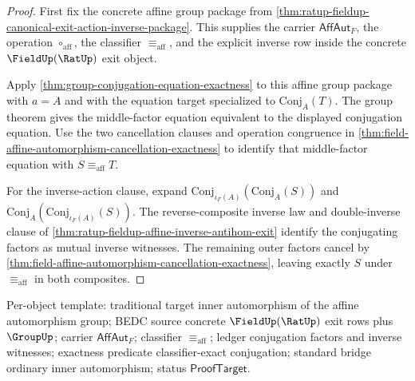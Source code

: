 \begin{proof}
First fix the concrete affine group package from
\autoref{thm:ratup-fieldup-canonical-exit-action-inverse-package}. This supplies
the carrier $\mathsf{AffAut}_F$, the operation $\circ_{\mathrm{aff}}$, the
classifier $\equiv_{\mathrm{aff}}$, and the explicit inverse row inside the
concrete $\FieldUp(\RatUp)$ exit object.

Apply \autoref{thm:group-conjugation-equation-exactness} to this affine group
package with $a=A$ and with the equation target specialized to
$\mathrm{Conj}_A(T)$. The group theorem gives the middle-factor equation
equivalent to the displayed conjugation equation. Use the two cancellation
clauses and operation congruence in
\autoref{thm:field-affine-automorphism-cancellation-exactness} to identify that
middle-factor equation with $S\equiv_{\mathrm{aff}}T$.

For the inverse-action clause, expand
$\mathrm{Conj}_{\iota_F(A)}(\mathrm{Conj}_A(S))$ and
$\mathrm{Conj}_A(\mathrm{Conj}_{\iota_F(A)}(S))$. The reverse-composite inverse
law and double-inverse clause of
\autoref{thm:ratup-fieldup-affine-inverse-antihom-exit} identify the conjugating
factors as mutual inverse witnesses. The remaining outer factors cancel by
\autoref{thm:field-affine-automorphism-cancellation-exactness}, leaving exactly
$S$ under $\equiv_{\mathrm{aff}}$ in both composites.
\end{proof}

Per-object template: traditional target inner automorphism of the affine
automorphism group; BEDC source concrete $\FieldUp(\RatUp)$ exit rows plus
$\GroupUp$; carrier $\mathsf{AffAut}_F$; classifier $\equiv_{\mathrm{aff}}$;
ledger conjugation factors and inverse witnesses; exactness predicate
classifier-exact conjugation; standard bridge ordinary inner automorphism;
status $\mathsf{ProofTarget}$.

